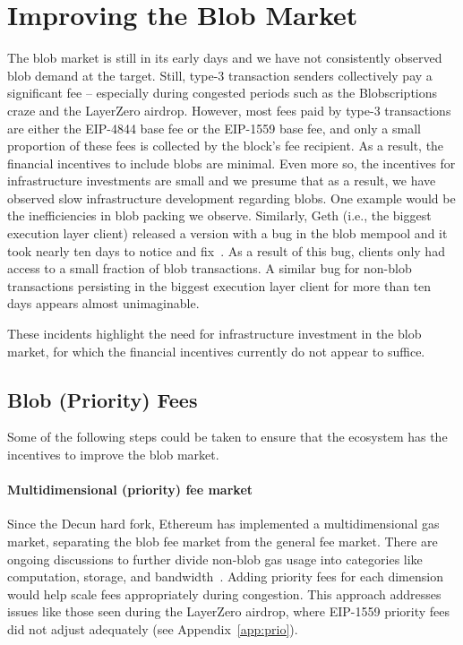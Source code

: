 \section{Improving the Blob Market}
The blob market is still in its early days and we have not consistently observed blob demand at the target. Still, type-3 transaction senders collectively pay a significant fee -- especially during congested periods such as the Blobscriptions craze and the LayerZero airdrop. However, most fees paid by type-3 transactions are either the EIP-4844 base fee or the EIP-1559 base fee, and only a small proportion of these fees is collected by the block's fee recipient. As a result, the financial incentives to include blobs are minimal. Even more so, the incentives for infrastructure investments are small and we presume that as a result, we have observed slow infrastructure development regarding blobs. One example would be the inefficiencies in blob packing we observe. Similarly, Geth (i.e., the biggest execution layer client) released a version with a bug in the blob mempool and it took nearly ten days to notice and fix~\parencite{szilagyi2024,szilagyi2024tweet2,szilagyi2024tweet3,szilagyi2024tweet4}. As a result of this bug, clients only had access to a small fraction of blob transactions. A similar bug for non-blob transactions persisting in the biggest execution layer client for more than ten days appears almost unimaginable. 

These incidents highlight the need for infrastructure investment in the blob market, for which the financial incentives currently do not appear to suffice. 

\subsection{Blob (Priority) Fees}
Some of the following steps could be taken to ensure that the ecosystem has the incentives to improve the blob market. 

\paragraph{Multidimensional (priority) fee market} Since the Decun hard fork, Ethereum has implemented a multidimensional gas market, separating the blob fee market from the general fee market. There are ongoing discussions to further divide non-blob gas usage into categories like computation, storage, and bandwidth~\parencite{buterin2024multidimensional}. Adding priority fees for each dimension would help scale fees appropriately during congestion. This approach addresses issues like those seen during the LayerZero airdrop, where EIP-1559 priority fees did not adjust adequately (see Appendix~\ref{app:prio}).


